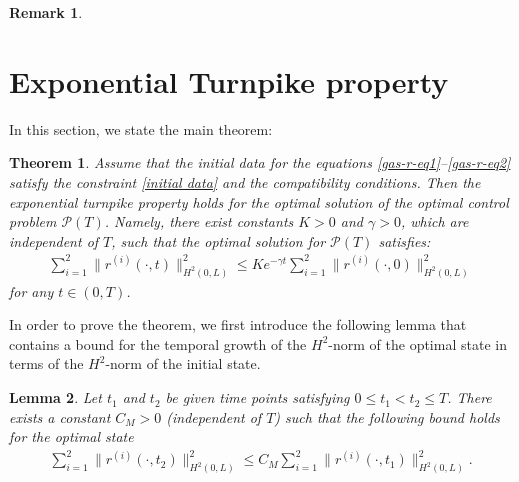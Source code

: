 \documentclass[12pt]{article}
\newtheorem{theorem}{Theorem}[section]
\newtheorem{lemma}[theorem]{Lemma}
\newtheorem{remark}{Remark}[section]
\numberwithin{equation}{section}
\begin{document}
\begin{remark}
\end{remark}


 

\section{Exponential Turnpike property}\label{section:4}

In this section, we state the main theorem:
\begin{theorem}\label{thm14}
Assume that the initial data for the equations \eqref{gas-r-eq1}--\eqref{gas-r-eq2} satisfy the constraint \eqref{initial data} and the compatibility conditions. Then the exponential turnpike property holds for the optimal solution of the optimal control problem $\mathcal{P}(T)$. Namely, there exist constants $K>0$ and $\gamma>0$, which are independent of $T$, such that the optimal solution for $\mathcal{P}(T)$ satisfies:
\begin{align}\label{expo-turnpike}
\sum_{i=1}^2\|r^{(i)}(\cdot,t)\|^2_{H^2(0,L)}  \leq K e^{-\gamma t} \sum_{i=1}^2\|r^{(i)}(\cdot,0)\|^2_{H^2(0,L)}
\end{align}
for any $t\in(0,T)$. 
\end{theorem}
In order to prove the theorem, we first introduce the following lemma
that contains a bound for the  temporal growth of the $H^2$-norm of the   optimal state
in terms of the $H^2$-norm of the initial state. 
\begin{lemma}\label{lemma2.4}
Let $t_1$ and $t_2$ be given time points satisfying $0\leq t_1 < t_2\leq T$. 
There exists a constant $C_M>0$ 
(independent of $T$) 
such that the  following bound holds for the optimal state
\begin{align*}
\sum_{i=1}^2 \|r^{(i)}(\cdot,t_2) \|_{H^2(0,L)}^2  \leq C_M \sum_{i=1}^2  \|r^{(i)}(\cdot,t_1) \|_{H^2(0,L)}^2.
\end{align*}    
\end{lemma}
\end{document}
